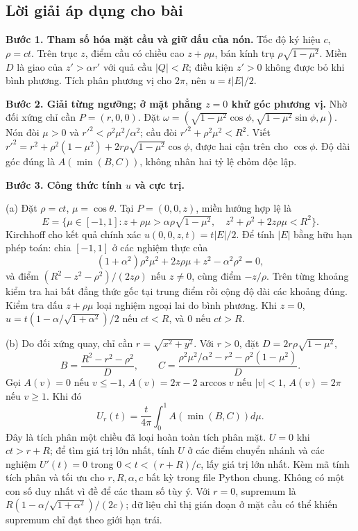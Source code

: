 \documentclass[10pt,a4paper]{article}
\begin{document}
\subsection*{Lời giải áp dụng cho bài}
\textbf{Bước 1. Tham số hóa mặt cầu và giữ dấu của nón.} Tốc độ ký hiệu $c$, $\rho=ct$. Trên trục $z$, điểm cầu có chiều cao $z+\rho\mu$, bán kính trụ $\rho\sqrt{1-\mu^2}$. Miền $D$ là giao của $z'>\alpha r'$ với quả cầu $|Q|<R$; điều kiện $z'>0$ không được bỏ khi bình phương. Tích phân phương vị cho $2\pi$, nên $u=t|E|/2$.

\textbf{Bước 2. Giải từng ngưỡng; ở mặt phẳng $z=0$ khử góc phương vị.} Nhờ đối xứng chỉ cần $P=(r,0,0)$. Đặt $\omega=(\sqrt{1-\mu^2}\cos\phi,\sqrt{1-\mu^2}\sin\phi,\mu)$. Nón đòi $\mu>0$ và $r'^2<\rho^2\mu^2/\alpha^2$; cầu đòi $r'^2+\rho^2\mu^2<R^2$. Viết $r'^2=r^2+\rho^2(1-\mu^2)+2r\rho\sqrt{1-\mu^2}\cos\phi$, được hai cận trên cho $\cos\phi$. Độ dài góc đúng là $A(\min(B,C))$, không nhân hai tỷ lệ chỏm độc lập.

\textbf{Bước 3. Công thức tính $u$ và cực trị.}

(a) Đặt $\rho=ct$, $\mu=\cos\theta$. Tại $P=(0,0,z)$, miền hướng hợp lệ là
\[E=\{\mu\in[-1,1]:z+\rho\mu>\alpha\rho\sqrt{1-\mu^2},\quad z^2+\rho^2+2z\rho\mu<R^2\}.\]
Kirchhoff cho kết quả chính xác $u(0,0,z,t)=t|E|/2$. Để tính $|E|$ bằng hữu hạn phép toán: chia $[-1,1]$ ở các nghiệm thực của
\[(1+\alpha^2)\rho^2\mu^2+2z\rho\mu+z^2-\alpha^2\rho^2=0,\]
và điểm $(R^2-z^2-\rho^2)/(2z\rho)$ nếu $z\ne0$, cùng điểm $-z/\rho$. Trên từng khoảng kiểm tra hai bất đẳng thức gốc tại trung điểm rồi cộng độ dài các khoảng đúng. Kiểm tra dấu $z+\rho\mu$ loại nghiệm ngoại lai do bình phương. Khi $z=0$, $u=t(1-\alpha/\sqrt{1+\alpha^2})/2$ nếu $ct<R$, và 0 nếu $ct>R$.

(b) Do đối xứng quay, chỉ cần $r=\sqrt{x^2+y^2}$. Với $r>0$, đặt $D=2r\rho\sqrt{1-\mu^2}$,
\[B=\frac{R^2-r^2-\rho^2}{D},\qquad C=\frac{\rho^2\mu^2/\alpha^2-r^2-\rho^2(1-\mu^2)}D.\]
Gọi $A(v)=0$ nếu $v\le-1$, $A(v)=2\pi-2\arccos v$ nếu $|v|<1$, $A(v)=2\pi$ nếu $v\ge1$. Khi đó
\[U_r(t)=\frac t{4\pi}\int_0^1A(\min(B,C))d\mu.\]
Đây là tích phân một chiều đã loại hoàn toàn tích phân mặt. $U=0$ khi $ct>r+R$; để tìm giá trị lớn nhất, tính $U$ ở các điểm chuyển nhánh và các nghiệm $U'(t)=0$ trong $0<t<(r+R)/c$, lấy giá trị lớn nhất. Kèm mã tính tích phân và tối ưu cho $r,R,\alpha,c$ bất kỳ trong file Python chung. Không có một con số duy nhất vì đề để các tham số tùy ý. Với $r=0$, supremum là $R(1-\alpha/\sqrt{1+\alpha^2})/(2c)$; dữ liệu chỉ thị gián đoạn ở mặt cầu có thể khiến supremum chỉ đạt theo giới hạn trái.
\end{document}
